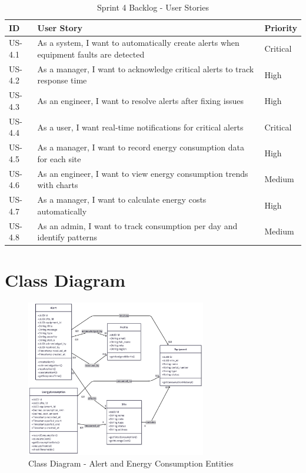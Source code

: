 \begin{table}[htbp]
\centering
\caption{Sprint 4 Backlog - User Stories}
\small
\begin{tabular}{|p{0.8cm}|p{9cm}|p{1.8cm}|}
\hline
\textbf{ID} & \textbf{User Story} & \textbf{Priority} \\
\hline
US-4.1 & As a system, I want to automatically create alerts when equipment faults are detected & Critical \\
\hline
US-4.2 & As a manager, I want to acknowledge critical alerts to track response time & High \\
\hline
US-4.3 & As an engineer, I want to resolve alerts after fixing issues & High \\
\hline
US-4.4 & As a user, I want real-time notifications for critical alerts & Critical \\
\hline
US-4.5 & As a manager, I want to record energy consumption data for each site & High \\
\hline
US-4.6 & As an engineer, I want to view energy consumption trends with charts & Medium \\
\hline
US-4.7 & As a manager, I want to calculate energy costs automatically & High \\
\hline
US-4.8 & As an admin, I want to track consumption per day and identify patterns & Medium \\
\hline
\end{tabular}
\end{table}

\section{Class Diagram}

\begin{figure}[H]
\centering
\includegraphics[width=0.7\textwidth]{img/chap_06/class_diagram_sprint4.png}
\caption{Class Diagram - Alert and Energy Consumption Entities}
\end{figure}

